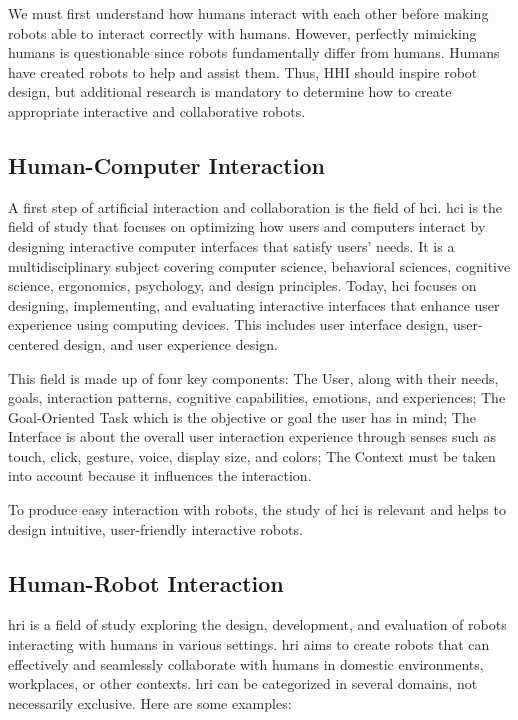 We must first understand how humans interact with each other before making robots able to interact correctly with humans. However, perfectly mimicking humans is questionable since robots fundamentally differ from humans. Humans have created robots to help and assist them. Thus, HHI should inspire robot design, but additional research is mandatory to determine how to create appropriate interactive and collaborative robots.

\subsection{Human-Computer Interaction}

A first step of artificial interaction and collaboration is the field of \acrfull{hci}. \acrshort{hci} is the field of study that focuses on optimizing how users and computers interact by designing interactive computer interfaces that satisfy users' needs. It is a multidisciplinary subject covering computer science, behavioral sciences, cognitive science, ergonomics, psychology, and design principles.
Today, \acrshort{hci} focuses on designing, implementing, and evaluating interactive interfaces that enhance user experience using computing devices. This includes user interface design, user-centered design, and user experience design. 

This field is made up of four key components: 
The User, along with their needs, goals, interaction patterns, cognitive capabilities, emotions, and experiences; 
The Goal-Oriented Task which is the objective or goal the user has in mind; 
The Interface is about the overall user interaction experience through senses such as touch, click, gesture, voice, display size, and colors;
The Context must be taken into account because it influences the interaction. 

To produce easy interaction with robots, the study of \acrshort{hci} is relevant and helps to design intuitive, user-friendly interactive robots.

\subsection{Human-Robot Interaction}

\acrfull{hri} is a field of study exploring the design, development, and evaluation of robots interacting with humans in various settings. \acrshort{hri} aims to create robots that can effectively and seamlessly collaborate with humans in domestic environments, workplaces, or other contexts. 
\acrshort{hri} can be categorized in several domains, not necessarily exclusive. Here are some examples:

